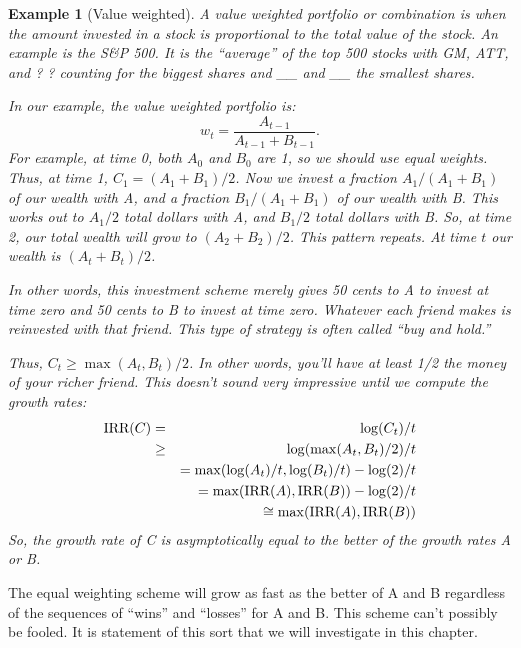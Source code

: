 \documentclass{book}
\newtheorem{example}{Example}[chapter]
\begin{document}
\begin{example}[Value weighted] \label{example:value_weighted}  A value
  weighted portfolio or combination is when the amount invested in a
  stock is proportional to the total value of the stock.  An example
  is the S\&P 500.  It is the ``average'' of the top 500 stocks with
  GM, ATT, and ? ? counting for the biggest shares and \_\_ and \_\_
  the smallest shares.

  In our example, the value weighted portfolio is:
  $$w_{t}=\frac{A_{t-1}}{A_{t-1}+B_{t-1}}.$$
  For example, at time 0, both $A_0$ and $B_0$ are 1, so we should use
  equal weights.  Thus, at time 1, $C_1 = (A_1 + B_1)/2$.  Now we
  invest a fraction $A_1/(A_1+B_1)$ of our wealth with A, and a
  fraction 
  $B_1/(A_1+B_1)$ of our wealth with B.  This works out to $A_1/2$
  total dollars with A, and $B_1/2$ total dollars with B.  So, at time
  2, our total wealth will grow to $(A_2+B_2)/2$.  This pattern
  repeats.  At time $t$ our wealth is $(A_t + B_t)/2$.

  In other words, this investment scheme merely gives 50 cents to A to
  invest at time zero and 50 cents to B to invest at time zero.
  Whatever each friend makes is reinvested with that friend.  This
  type of strategy is often called ``buy and hold.''

  Thus, $C_{t} \ge  \max(A_{t},B_{t})/2$.  In other words, you'll have at
  least 1/2 the money of your richer friend.  This doesn't sound very
  impressive until we compute the growth rates:
  \begin{eqnarray*}
    \hbox{IRR}(C) &=&     \log(C_t)/t \\
    &\ge& \log(\max(A_t,B_t)/2)/t \\
    &&= \max(\log(A_t)/t,\log(B_t)/t) -\log(2)/t \\
    && = \max(\hbox{IRR}(A),\hbox{IRR}(B)) - \log(2)/t \\
    && \cong \max(\hbox{IRR}(A),\hbox{IRR}(B)) 
  \end{eqnarray*}
  So, the growth rate of C is asymptotically equal to the better of
  the growth rates A or B.  
\end{example}

The equal weighting scheme will grow as fast as the better of A and B
regardless of the sequences of ``wins'' and ``losses'' for A and B.
This scheme can't possibly be fooled.  It is statement of this
sort that we will investigate in this chapter.  
\end{document}
